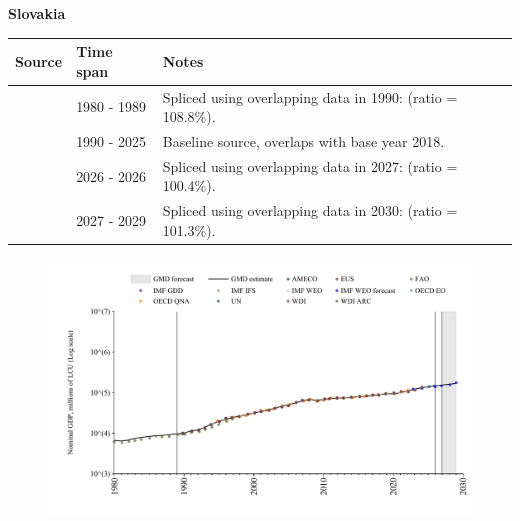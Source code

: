 \documentclass[12pt,a4paper,landscape]{article}
\begin{document}
\begin{adjustbox}{max totalsize={\paperwidth}{\paperheight},center}
\begin{minipage}[t][\textheight][t]{\textwidth}
\vspace*{0.5cm}
{}
\begin{center}
{\Large\bfseries Slovakia}
\end{center}
\vspace{0.5cm}
\begin{table}[H]
\centering
\small
\begin{tabular}{|l|l|l|}
\hline
\textbf{Source} & \textbf{Time span} & \textbf{Notes} \\
\hline
\rowcolor{white}\cite{WDI_ARC}& 1980 - 1989 &Spliced using overlapping data in 1990: (ratio = 108.8\%).\\
\rowcolor{lightgray}\cite{OECD_EO}& 1990 - 2025 &Baseline source, overlaps with base year 2018.\\
\rowcolor{white}\cite{AMECO}& 2026 - 2026 &Spliced using overlapping data in 2027: (ratio = 100.4\%).\\
\rowcolor{lightgray}\cite{IMF_WEO_forecast}& 2027 - 2029 &Spliced using overlapping data in 2030: (ratio = 101.3\%).\\
\hline
\end{tabular}
\end{table}
\begin{figure}[H]
\centering
\includegraphics[width=\textwidth,height=0.6\textheight,keepaspectratio]{graphs/SVK_nGDP.pdf}
\end{figure}
\end{minipage}
\end{adjustbox}
\end{document}
